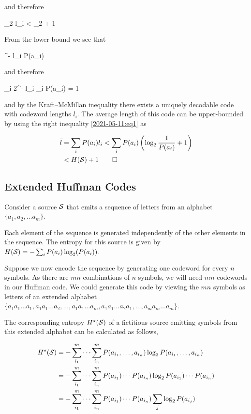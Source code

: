 and therefore

\be
\label{2021-05-11:eq1}
\log_2  \leq l_i < \log_2  + 1
\ee

From the lower bound we see that

^{- l_i} \leq P(a_i)
\eee

and therefore

\bee
\sum_i 2^{- l_i} \leq \sum_i P(a_i) = 1
\eee

and by the Kraft–McMillan inequality there exists a uniquely decodable code with codeword lengths $l_i$. The average length of this code can be upper-bounded by using the right inequality \ref{2021-05-11:eq1} as

\begin{align*}
    \bar{l} &= \sum_i P(a_i) l_i < \sum_i P(a_i) \left( \log_2 \frac{1}{P(a_i)} + 1 \right) \\
    &< H(\mathcal{S}) + 1 \qed
\end{align*}


\subsection{Extended Huffman Codes}

Consider a source $\mathcal{S}$ that emits a sequence of letters from an alphabet $\{a_1, a_2, \ldots a_m \}$. 

Each element of the sequence is generated independently of the other elements in the sequence. The entropy for this source is given by $H(\mathcal{S}) = - \sum_i P(a_i) \log_2 (P(a_i))$.

Suppose we now encode the sequence by generating one codeword for every $n$ symbols. As there are $mn$ combinations of $n$ symbols, we will need $mn$ codewords in our Huffman code. We could generate this code by viewing the $mn$ symbols as letters of an extended alphabet $\{a_1 a_1 \ldots a_1 , a_1 a_1 \ldots a_2 , \ldots , a_1 a_1 \ldots a_m , a_1 a_1 \ldots a_2 a_1 , \ldots , a_m a_m \ldots a_m \}$.

The corresponding entropy $H^\star(\mathcal{S})$ of a fictitious source emitting symbols from this extended alphabet can be calculated as follows,

\begin{align*}
    H^\star(\mathcal{S}) &= - \sum_{i_1}^m \cdots \sum_{i_n}^m P(a_{i_1}, \ldots, a_{i_n}) \log_2 P(a_{i_1}, \ldots, a_{i_n}) \\
    &= - \sum_{i_1}^m \cdots \sum_{i_n}^m P(a_{i_1})  \cdots P(a_{i_n}) \log_2 P(a_{i_1}) \cdots P(a_{i_n}) \\
    &= - \sum_{i_1}^m \cdots \sum_{i_n}^m P(a_{i_1})  \cdots P(a_{i_n}) \sum_j \log_2 P(a_{i_j})
\end{align*}

